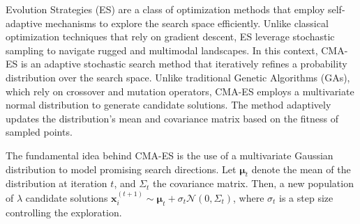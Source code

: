 Evolution Strategies (ES) are a class of optimization methods that employ self-adaptive mechanisms to explore the search space efficiently. 
Unlike classical optimization techniques that rely on gradient descent, ES leverage stochastic sampling to navigate rugged and multimodal landscapes.
In this context, CMA-ES is an adaptive stochastic search method that iteratively refines a probability distribution over the search space. 
Unlike traditional Genetic Algorithms (GAs), which rely on crossover and mutation operators, CMA-ES employs a multivariate normal distribution to generate candidate solutions. 
The method adaptively updates the distribution's mean and covariance matrix based on the fitness of sampled points.

The fundamental idea behind CMA-ES is the use of a multivariate Gaussian distribution to model promising search directions. 
Let $\mathbf{\mu}_t$ denote the mean of the distribution at iteration $t$, and $\Sigma_t$ the covariance matrix. 
Then, a new population of $\lambda$ candidate solutions $\mathbf{x}_i^{(t+1)} \sim \mathbf{\mu}_t + \sigma_t\mathcal{N}(0, \Sigma_t)$, where $\sigma_t$ is a step size controlling the exploration.  

